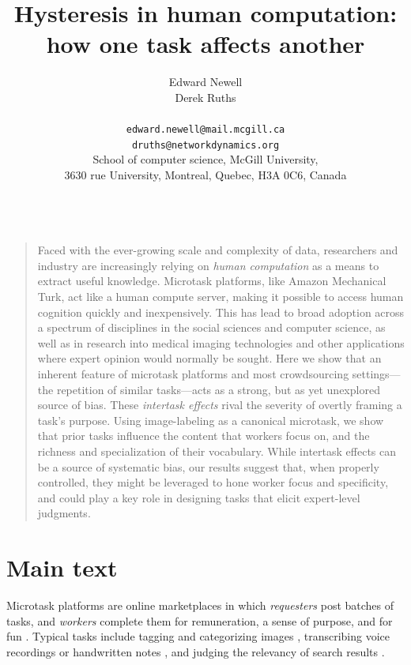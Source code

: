 \documentclass[12pt]{article}
\title{Hysteresis in human computation:\\ how one task affects another}
\author
{Edward Newell \\ Derek Ruths\\
\\
\normalsize{\texttt{edward.newell@mail.mcgill.ca}}\\
\normalsize{\texttt{druths@networkdynamics.org}}\\
\normalsize{School of computer science, McGill University,}\\
\normalsize{3630 rue University, Montreal, Quebec, H3A 0C6, Canada}\\
\\
}
\date{}
\newenvironment{sciabstract}{%
\begin{quote} \bf}
{\end{quote}}
\begin{document}
 


\baselineskip24pt


\maketitle 




\begin{sciabstract}

Faced with the ever-growing scale and complexity of data, researchers and
industry are increasingly relying on \textit{human computation} as a means
to extract useful knowledge.  Microtask
platforms, like Amazon Mechanical Turk, act like a human compute server,
making it possible to access human cognition quickly and inexpensively. 
This has lead to broad adoption across a spectrum of disciplines
in the social sciences and computer science, as well as in research into 
medical imaging technologies and other applications where expert opinion 
would normally be sought.  Here we show that an inherent
feature of microtask platforms and most crowdsourcing settings---the 
repetition of similar tasks---acts as a strong, but as yet unexplored source 
of bias.  These \textit{intertask effects} rival the
severity of overtly framing a task's purpose.  
Using image-labeling as a canonical microtask, we show that prior 
tasks influence the content that workers focus on, and the richness and
specialization of their vocabulary.    
While intertask effects can be a source of systematic bias, our
results suggest that, when properly controlled, they might be leveraged
to hone worker focus and specificity, and could play a key role in designing 
tasks that elicit expert-level judgments.
\end{sciabstract}

\section*{Main text}
Microtask platforms are online marketplaces in which \textit{requesters} 
post batches of tasks, and \textit{workers} complete them
for remuneration, a sense of purpose, and for fun
\cite{kazai2013analysis,Antin20122925}.  
Typical tasks include tagging and categorizing images 
\cite{6116320,Zhai2012357}, transcribing voice recordings 
\cite{chandler2013breaking,paolacci2010running}
or handwritten notes \cite{Berinsky2012351,Finnerty2013}, and judging the 
relevancy of search results 
\cite{le2010ensuring,grady2010crowdsourcing,alonso2009can,kazai2013analysis}.
\end{document}
